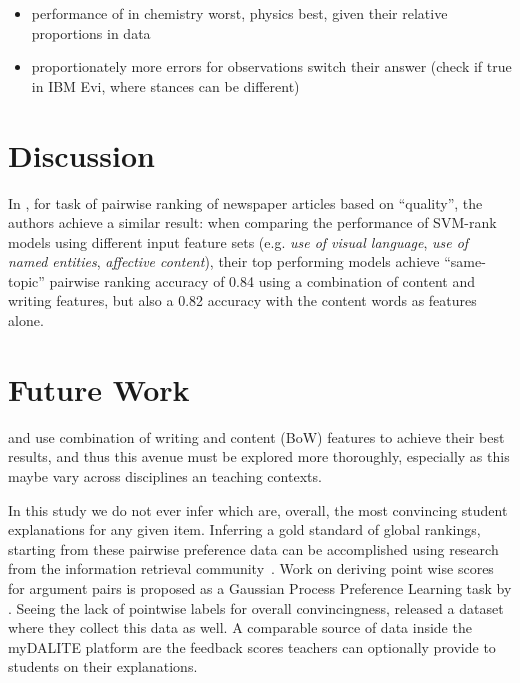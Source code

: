 \documentclass[runningheads]{llncs}
\begin{document}
\begin{itemize}
	\item performance of in chemistry worst, physics best, given their relative 
	proportions in data
	\item proportionately more errors for observations switch their answer 
	(check if true in IBM Evi, where stances can be different)
\end{itemize}

\section{Discussion}

In \cite{louis_what_2013}, for task of pairwise ranking of newspaper articles 
based on ``quality'', the authors achieve a similar result: when comparing the 
performance of SVM-rank models using different input feature sets (e.g. 
\textit{use of visual language}, \textit{use of named entities}, 
\textit{affective content}), their top performing models achieve ``same-topic'' 
pairwise ranking accuracy of 0.84 using a combination of content and writing 
features, but also a 0.82 accuracy with the content words as features alone.


\section{Future Work}
\cite{nguyen_computational_2015} and \cite{louis_what_2013} use combination of 
writing and content (BoW) features to achieve their best results, and thus this 
avenue must be explored more thoroughly, especially as this maybe vary across 
disciplines an teaching contexts.

In this study we do not ever infer which are, overall, the most convincing 
student explanations for any given item. Inferring a gold standard of global 
rankings, starting from these pairwise preference data can be accomplished 
using research from the information retrieval 
community~\cite{chen_pairwise_2013}. Work on deriving point wise scores for 
argument pairs is proposed as a Gaussian Process Preference Learning task by 
\cite{simpson_finding_2018}. Seeing the lack of pointwise labels for overall 
convincingness, \cite{toledo_automatic_2019} released a dataset where they 
collect this data as well. A comparable source of data inside the myDALITE 
platform are the feedback scores teachers can optionally provide to students on 
their explanations.


 
 
\end{document}

